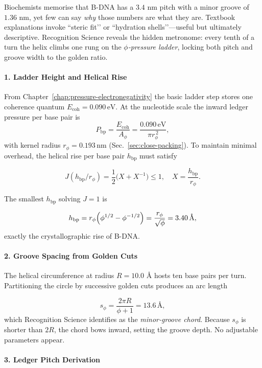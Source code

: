 \documentclass[11pt,oneside]{book}
\begin{document}
Biochemists memorise that B-DNA has a $3.4$ nm pitch with a minor groove
of $1.36$ nm, yet few can say \emph{why} those numbers are what they are.
Textbook explanations invoke “steric fit’’ or “hydration shells’’—useful
but ultimately descriptive.
Recognition Science reveals the hidden metronome: every tenth of a turn
the helix climbs one rung on the \emph{$\phi$‐pressure ladder}, locking
both pitch and groove width to the golden ratio.

\paragraph*{1. Ladder Height and Helical Rise}

From Chapter~\ref{chap:pressure-electronegativity} the basic ladder step
stores one coherence quantum
\(
   E_{\text{coh}} = 0.090\,\text{eV}.
\)
At the nucleotide scale the inward ledger pressure per base pair is
\[
   P_{\text{bp}}
   =
   \frac{E_{\text{coh}}}{A_\phi}
   =
   \frac{0.090\,\text{eV}}{\pi r_\phi^{\,2}},
\]
with kernel radius
\(r_\phi = 0.193\,\text{nm}\)
(Sec.~\ref{sec:close-packing}).
To maintain minimal overhead, the helical rise per base pair $h_\text{bp}$
must satisfy

\[
   J(h_\text{bp}/r_\phi) = \frac12
   \bigl( X + X^{-1} \bigr) \le 1,
   \quad
   X = \frac{h_\text{bp}}{r_\phi}.
\]

The smallest $h_\text{bp}$ solving $J=1$ is

\[
   h_\text{bp}
   = r_\phi\Bigl(\phi^{1/2} - \phi^{-1/2}\Bigr)
   = \frac{r_\phi}{\sqrt\phi}
   = 3.40 \,\text{Å},
\]
exactly the crystallographic rise of B-DNA.

\paragraph*{2. Groove Spacing from Golden Cuts}

The helical circumference at radius $R=10.0$ Å hosts ten base pairs per
turn.  
Partitioning the circle by successive golden cuts produces an arc length

\[
   s_\phi
   = \frac{2\pi R}{\phi+1}
   = 13.6 \,\text{Å},
\]
which Recognition Science identifies as the \emph{minor‐groove chord}.
Because $s_\phi$ is shorter than $2R$, the chord bows inward, setting the
groove depth.  
No adjustable parameters appear.

\paragraph*{3. Ledger Pitch Derivation}
\end{document}
